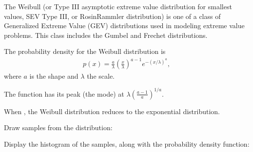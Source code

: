 \documentclass[letterpaper,10pt,english]{sphinxmanual}
\begin{document}
\begin{fulllineitems}
The Weibull (or Type III asymptotic extreme value distribution
for smallest values, SEV Type III, or Rosin\sphinxhyphen{}Rammler
distribution) is one of a class of Generalized Extreme Value
(GEV) distributions used in modeling extreme value problems.
This class includes the Gumbel and Frechet distributions.

The probability density for the Weibull distribution is
\begin{equation*}
\begin{split}p(x) = \frac{a}
{\lambda}(\frac{x}{\lambda})^{a-1}e^{-(x/\lambda)^a},\end{split}
\end{equation*}
where \(a\) is the shape and \(\lambda\) the scale.

The function has its peak (the mode) at
\(\lambda(\frac{a-1}{a})^{1/a}\).

When , the Weibull distribution reduces to the exponential
distribution.

Draw samples from the distribution:

\begin{sphinxVerbatim}[commandchars=\\\{\}]
   
   
\end{sphinxVerbatim}

Display the histogram of the samples, along with
the probability density function:

\begin{sphinxVerbatim}[commandchars=\\\{\}]
   
  
 
                 
\end{sphinxVerbatim}


\end{fulllineitems}
\end{document}

